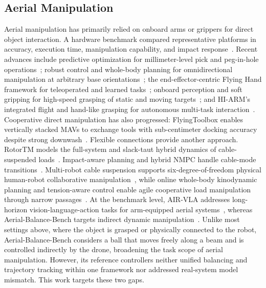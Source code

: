 \documentclass[letterpaper, 10 pt, conference]{ieeeconf}  %
\begin{document}
\subsection{Aerial Manipulation}
Aerial manipulation has primarily relied on onboard arms or grippers for direct object interaction. A hardware
benchmark compared representative platforms in accuracy, execution time, manipulation capability, and impact
response~\cite{2020_ral_benchmarks_for_aerial_manipulation}. Recent advances include predictive optimization for
millimeter-level pick and peg-in-hole operations~\cite{wang2024millimeter}; robust control and whole-body planning
for omnidirectional manipulation at arbitrary base orientations~\cite{2025_ijrr_omnidirectional_aerial_manipulator};
the end-effector-centric Flying Hand framework for teleoperated and learned tasks~\cite{he2025flyingHand}; onboard
perception and soft gripping for high-speed grasping of static and moving targets~\cite{2024_npj_robotics_aerial_grasp};
and HI-ARM's integrated flight and hand-like grasping for autonomous multi-task
interaction~\cite{wu2026handLike}. Cooperative direct manipulation has also progressed: FlyingToolbox enables
vertically stacked MAVs to exchange tools with sub-centimeter docking accuracy despite strong
downwash~\cite{cao2025proximal}. Flexible connections provide another approach. RotorTM models the full-system and
slack-taut hybrid dynamics of cable-suspended loads~\cite{2023_tro_rotortm}. Impact-aware planning and hybrid NMPC
handle cable-mode transitions~\cite{2024_tro_impact_aware_payloads}. Multi-robot cable suspension supports
six-degree-of-freedom physical human-robot collaborative manipulation~\cite{2024_tro_human_aware_payload_transportation},
while online whole-body kinodynamic planning and tension-aware control enable agile cooperative load manipulation
through narrow passages~\cite{sun2025agile}. At the benchmark level, AIR-VLA addresses long-horizon
vision-language-action tasks for arm-equipped aerial systems~\cite{2026_arxiv_air_vla}, whereas
Aerial-Balance-Bench targets indirect dynamic manipulation~\cite{liu2026aerialBalanceBench}. Unlike most settings
above, where the object is grasped or physically connected to the robot, Aerial-Balance-Bench considers a ball that moves freely
along a beam and is controlled indirectly by the drone, broadening the task scope of aerial manipulation. However,
its reference controllers neither unified balancing and trajectory tracking within one framework nor addressed
real-system model mismatch. This work targets these two gaps.
\end{document}
